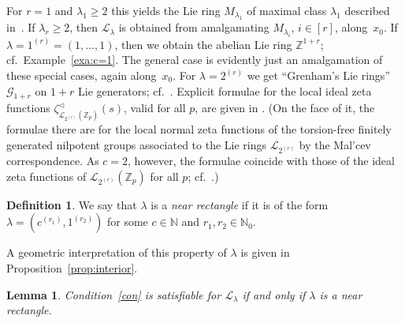 \documentclass[11pt]{amsart}
\numberwithin{equation}{section}
\numberwithin{figure}{section}
\theoremstyle{plain}
\newtheorem{lemma}[theorem]{Lemma}
\theoremstyle{definition}
\newtheorem{definition}[theorem]{Definition}
\theoremstyle{remark}
\begin{document}
For $r=1$ and $\lambda_1\geq 2$ this yields the Lie ring
$M_{\lambda_1}$ of maximal class $\lambda_1$ described
in~\cite[p.~99]{duSWoodward/08}. If $\lambda_r\geq 2$, then
${\ensuremath{\mathcal{L}}}_{\lambda}$ is obtained from amalgamating $M_{\lambda_i}$,
$i\in[r]$, along~$x_0$. If $\lambda=1^{(r)}=(1,\dots,1)$, then we
obtain the abelian Lie ring ${\ensuremath{\mathbb{Z}}}^{1+r}$;
cf.\ Example~\ref{exa:c=1}. The general case is evidently just an
amalgamation of these special cases, again along~$x_0$. For
$\lambda=2^{(r)}$ we get ``Grenham's Lie rings'' $\mathcal{G}_{1+r}$
on $1+r$ Lie generators;
cf.\ \cite[Section~2.6]{duSWoodward/08}. Explicit formulae for the
local ideal zeta functions $\zeta^{\triangleleft}_{{\ensuremath{\mathcal{L}}}_{2^{(r)}}({\ensuremath{\mathbb{Z}_p}})}(s)$,
valid for all $p$, are given in \cite[Theorem~5]{Voll/05}. (On the
face of it, the formulae there are for the local normal zeta functions
of the torsion-free finitely generated nilpotent groups associated to
the Lie rings ${\ensuremath{\mathcal{L}}}_{2^{(r)}}$ by the Mal'cev correspondence. As
$c=2$, however, the formulae coincide with those of the ideal zeta
functions of ${\ensuremath{\mathcal{L}}}_{2^{(r)}}({\ensuremath{\mathbb{Z}_p}})$ for all $p$; cf.\ \cite[Remark on
  p.~206]{GSS/88}.)

\begin{definition}
 We say that $\lambda$ is a \emph{near rectangle} if it is of the form
 $\lambda= (c^{(r_1)}, 1^{(r_2)})$ for some $c\in{\ensuremath{\mathbb{N}}}$ and
 $r_1,r_2\in{\ensuremath{\mathbb{N}}}_0$.  
\end{definition}

A geometric interpretation of this property of $\lambda$ is given in
Proposition~\ref{prop:interior}.  

\begin{lemma}\label{lem:near.rectangle}
 Condition~\ref{con} is satisfiable for ${\ensuremath{\mathcal{L}}}_{\lambda}$ if and only
 if $\lambda$ is a near rectangle.
\end{lemma}
\end{document}
